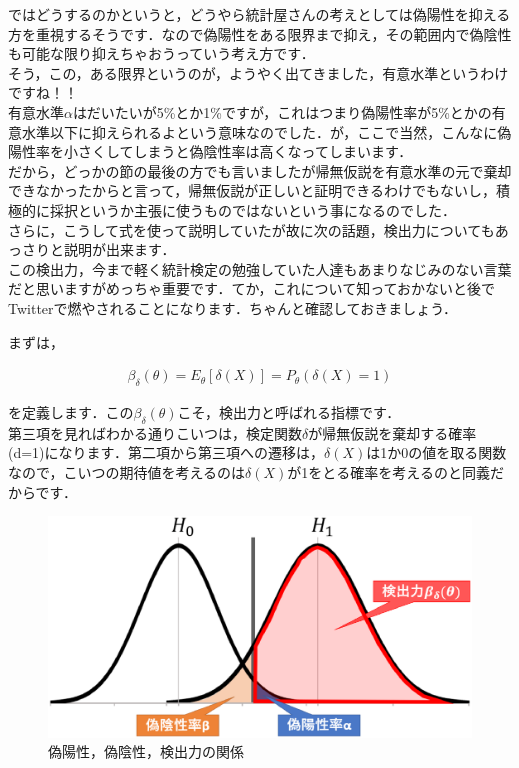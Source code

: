 \documentclass[11pt,a4paper]{ujreport} 	%
\begin{document}
ではどうするのかというと，どうやら統計屋さんの考えとしては偽陽性を抑える方を重視するそうです．なので偽陽性をある限界まで抑え，その範囲内で偽陰性も可能な限り抑えちゃおうっていう考え方です．\\

そう，この，ある限界というのが，ようやく出てきました，有意水準というわけですね！！\\

有意水準$\alpha$はだいたいが5\%とか1\%ですが，これはつまり偽陽性率が5\%とかの有意水準以下に抑えられるよという意味なのでした．が，ここで当然，こんなに偽陽性率を小さくしてしまうと偽陰性率は高くなってしまいます．\\

だから，どっかの節の最後の方でも言いましたが帰無仮説を有意水準の元で棄却できなかったからと言って，帰無仮説が正しいと証明できるわけでもないし，積極的に採択というか主張に使うものではないという事になるのでした．\\

さらに，こうして式を使って説明していたが故に次の話題，検出力についてもあっさりと説明が出来ます．\\

この検出力，今まで軽く統計検定の勉強していた人達もあまりなじみのない言葉だと思いますがめっちゃ重要です．てか，これについて知っておかないと後でTwitterで燃やされることになります．ちゃんと確認しておきましょう．

まずは，

\begin{align}
  \beta_\delta(\theta) = E_\theta[\delta(X)] = P_\theta(\delta(X)=1)
\end{align}

を定義します．この$\beta_\delta(\theta)$こそ，検出力と呼ばれる指標です．\\

第三項を見ればわかる通りこいつは，検定関数$\delta$が帰無仮説を棄却する確率(d=1)になります．第二項から第三項への遷移は，$\delta(X)$は1か0の値を取る関数なので，こいつの期待値を考えるのは$\delta(X)$が1をとる確率を考えるのと同義だからです．\\

\begin{figure}[H]
  \label{im:power}
  \includegraphics[width=15cm]{../figures/power-dist.eps}
  \caption{偽陽性，偽陰性，検出力の関係}
\end{figure}
\end{document}

